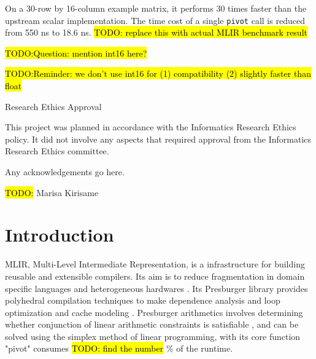 \documentclass[logo,bsc,singlespacing,parskip]{infthesis}
\begin{document}
\begin{preliminary}
{On a 30-row by 16-column example matrix, it performs 30 times faster than the
upstream scalar implementation. The time cost of a single \texttt{pivot} call is
reduced from 550 ns to 18.6 ns. \hl{TODO: replace this with actual MLIR benchmark
result}

\hl{TODO:Question: mention int16 here?}

\hl{TODO:Reminder: we don't use int16 for (1) compatibility (2) slightly faster than float}

}

\maketitle

\newenvironment{ethics}
   {\begin{frontenv}{Research Ethics Approval}{\LARGE}}
   {\end{frontenv}\newpage}

\begin{ethics}

This project was planned in accordance with the Informatics Research
Ethics policy. It did not involve any aspects that required approval
from the Informatics Research Ethics committee.

\standarddeclaration
\end{ethics}


\begin{acknowledgements}
Any acknowledgements go here.

\hl{TODO:}
Marisa Kirisame 

\end{acknowledgements}


\tableofcontents
\end{preliminary}


\chapter{Introduction}
\label{sec:introduction}

MLIR, Multi-Level Intermediate Representation, is a infrastructure for building
reusable and extensible compilers. Its aim is to reduce fragmentation in domain
specific languages and heterogeneous hardwares \cite{mlir}. Its Presburger
library provides polyhedral compilation techniques to make dependence analysis
and loop optimization \cite{mliraffine} and cache modeling \cite{CacheModel}.
Presburger arithmetics involves determining whether conjunction of linear
arithmetic constraints is satisfiable \cite{SMLPPA}, and can be solved using the
simplex method of linear programming, with its core function "pivot" consumes
\hl{TODO: find the number} \% \cite{FPL1} of the runtime. 
\end{document}
